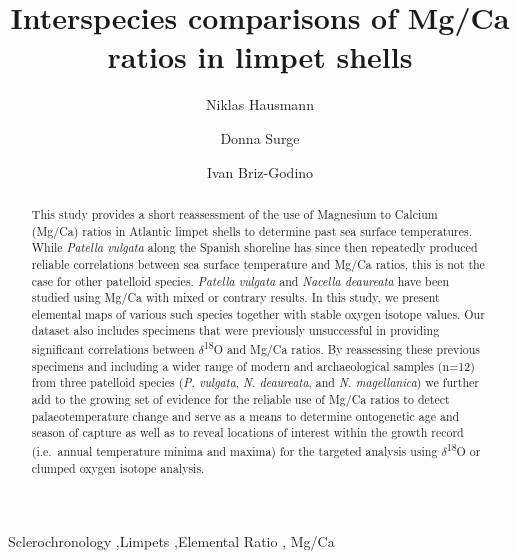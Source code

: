 \documentclass[
  authoryear,
  preprint,
  3p]{elsarticle}
\begin{document}
\begin{frontmatter}
\title{Interspecies comparisons of Mg/Ca ratios in limpet shells}
\author[1]{Niklas Hausmann%
%
}
\author[2]{Donna Surge%
%
}

\author[3]{Ivan Briz-Godino%
%
}






        
\begin{abstract}
This study provides a short reassessment of the use of Magnesium to
Calcium (Mg/Ca) ratios in Atlantic limpet shells to determine past sea
surface temperatures. While \emph{Patella vulgata} along the Spanish
shoreline has since then repeatedly produced reliable correlations
between sea surface temperature and Mg/Ca ratios, this is not the case
for other patelloid species. \emph{Patella vulgata} and \emph{Nacella
deaureata} have been studied using Mg/Ca with mixed or contrary results.
In this study, we present elemental maps of various such species
together with stable oxygen isotope values. Our dataset also includes
specimens that were previously unsuccessful in providing significant
correlations between \(\delta\)\textsuperscript{18}O and Mg/Ca ratios.
By reassessing these previous specimens and including a wider range of
modern and archaeological samples (n=12) from three patelloid species
(\emph{P. vulgata}, \emph{N. deaureata}, and \emph{N. magellanica}) we
further add to the growing set of evidence for the reliable use of Mg/Ca
ratios to detect palaeotemperature change and serve as a means to
determine ontogenetic age and season of capture as well as to reveal
locations of interest within the growth record (i.e.~annual temperature
minima and maxima) for the targeted analysis using
\(\delta\)\textsuperscript{18}O or clumped oxygen isotope analysis.
\end{abstract}





\begin{keyword}
    Sclerochronology \sep Limpets \sep Elemental Ratio \sep 
    Mg/Ca
\end{keyword}
\end{frontmatter}
    
\end{document}
